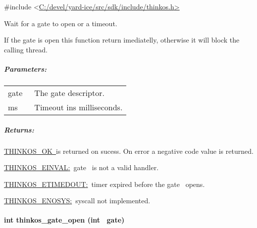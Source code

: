 {{}

{\#include
\textless{}}{\protect\hyperlink{h.pkwqa1}{C:/devel/yard-ice/src/sdk/include/thinkos.h}}{\protect\hyperlink{h.pkwqa1}{\textgreater{}}}

{Wait for a gate to open or a timeout. }

{If the gate is open this function return imediatelly, otherwise it will
block the calling thread.}

\subparagraph{\texorpdfstring{{Parameters:}}{Parameters:}}\label{parameters-43}

\protect\hypertarget{t.acc072d2f3bb4c2c47837e0a954ea1c3c6ac8b37}{}{}\protect\hypertarget{t.43}{}{}

\begin{longtable}[]{@{}ll@{}}
\toprule
\begin{minipage}[t]{0.47\columnwidth}\raggedright\strut
{gate}{~}\strut
\end{minipage} & \begin{minipage}[t]{0.47\columnwidth}\raggedright\strut
{The gate descriptor. }\strut
\end{minipage}\tabularnewline
\begin{minipage}[t]{0.47\columnwidth}\raggedright\strut
{ms}{~}\strut
\end{minipage} & \begin{minipage}[t]{0.47\columnwidth}\raggedright\strut
{Timeout ins milliseconds. }\strut
\end{minipage}\tabularnewline
\bottomrule
\end{longtable}

\subparagraph{\texorpdfstring{{Returns:}}{Returns:}}\label{returns-46}

{}

{\protect\hyperlink{h.2fk6b3p}{THINKOS\_OK}}{\protect\hyperlink{h.2fk6b3p}{~}}{is
returned on sucess. On error a negative code value is returned.}

{\protect\hyperlink{h.1tuee74}{THINKOS\_EINVAL}}{\protect\hyperlink{h.1tuee74}{:}}{~}{gate}{~
is not a valid handler.}

{\protect\hyperlink{h.upglbi}{THINKOS\_ETIMEDOUT}}{\protect\hyperlink{h.upglbi}{:}}{~timer
expired before the }{gate}{~ opens.}

{\protect\hyperlink{h.3s49zyc}{THINKOS\_ENOSYS}}{\protect\hyperlink{h.3s49zyc}{:}}{~syscall
not implemented. }

\paragraph{\texorpdfstring{{int thinkos\_gate\_open (int
~gate)}}{int thinkos\_gate\_open (int ~gate)}}\label{int-thinkos_gate_open-int-gate}

}
